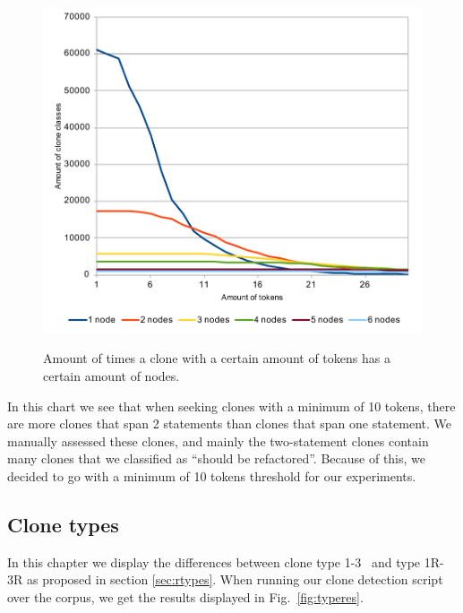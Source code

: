 \documentclass[a4paper]{article}
\begin{document}
\begin{figure}[H]
  \caption{Amount of times a clone with a certain amount of tokens has a certain amount of nodes.}
    \includegraphics[width=1\columnwidth]{img/TokenThreshold}
  \label{fig:tokenthreshold}
\end{figure}

In this chart we see that when seeking clones with a minimum of 10 tokens, there are more clones that span 2 statements than clones that span one statement. We manually assessed these clones, and mainly the two-statement clones contain many clones that we classified as ``should be refactored''. Because of this, we decided to go with a minimum of 10 tokens threshold for our experiments.

\subsection{Clone types}
In this chapter we display the differences between clone type 1-3~\cite{roy2007survey} and type 1R-3R as proposed in section \ref{sec:rtypes}. When running our clone detection script over the corpus, we get the results displayed in Fig.~\ref{fig:typeres}.
\end{document}
